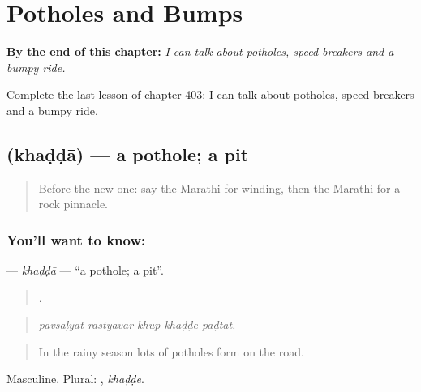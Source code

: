 
\chapter{Potholes and Bumps}
\label{ch:mr-potholes-and-bumps}

\begin{chapteropening}
\textbf{By the end of this chapter:} \emph{I can talk about potholes, speed breakers and a bumpy ride.}

Complete the last lesson of chapter 403: I can talk about potholes, speed breakers and a bumpy ride.
\end{chapteropening}

\section[\texorpdfstring{\mr{खड्डा} (khaḍḍā)}{खड्डा (khaḍḍā)}]{ (khaḍḍā) — a pothole; a pit}

\label{lesson:MR-C403-khadda}



\begin{quote}
Before the new one: say the Marathi for winding, then the Marathi for a rock pinnacle.
\end{quote}

\subsection*{You'll want to know: }
\textbf{} — \emph{khaḍḍā} — \textquotedblleft{}a pothole; a pit\textquotedblright{}.

\begin{quote}
    .
\end{quote}

\begin{quote}
\emph{pāvsāḷyāt rastyāvar khūp khaḍḍe paḍtāt.}
\end{quote}

\begin{quote}
In the rainy season lots of potholes form on the road.
\end{quote}

Masculine. Plural: , \emph{khaḍḍe}.

